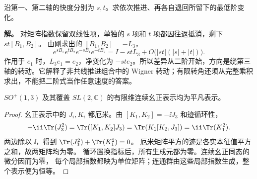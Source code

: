 \begin{workedexample}[交换两个小推进留下什么]
沿第一、第二轴的快度分别为 $s,t$。求依次推进、再各自退回所留下的最低阶变化。

\textbf{解。} 对矩阵指数保留双线性项，单独的 $s$ 项和 $t$ 项都因往返抵消，剩下 $st[B_1,B_2]$。
由刚求出的 $[B_1,B_2]=-L_3$，
\[
 e^{sB_1}e^{tB_2}e^{-sB_1}e^{-tB_2}
 =I-stL_3+O\!\bigl(|st|(|s|+|t|)\bigr).
\]
作用于 $e_1$ 时，$L_3e_1=e_2$，净变化为 $-st e_2$。所以差异从二阶开始，方向是绕第三轴的转动。它解释了非共线推进组合中的 Wigner 转动；有限转角还须从完整乘积求出，不能把二阶式当作任意速度的答案。
\end{workedexample}

\begin{theorem}
$SO^+(1,3)$ 及其覆盖 $SL(2,\mathbb C)$ 的有限维连续幺正表示均为平凡表示。
\end{theorem}
\begin{proof}
幺正表示中的 $J_i,K_i$ 都厄米。由 $[K_1,K_2]=-\ii J_3$ 和迹循环性，
\[
 -\ii\Tr(J_3^2)=\Tr([K_1,K_2]J_3)
 =\Tr(K_1[K_2,J_3])=\ii\Tr(K_1^2).
\]
两边除以 $\ii$，得到 $\Tr(J_3^2)+\Tr(K_1^2)=0$。
厄米矩阵平方的迹是各实本征值平方之和，故两矩阵均为零。
循环置换指标后，所有生成元都为零。连续幺正同态的微分因而为零，
每个局部指数都映为单位矩阵；连通群由这些局部指数生成，整个表示便为恒等。
\end{proof}

